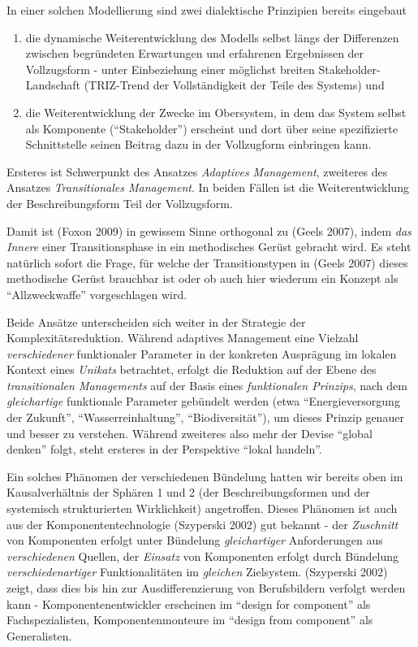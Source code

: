 \documentclass[11pt,a4paper]{article}
\begin{document}
In einer solchen Modellierung sind zwei dialektische Prinzipien bereits
eingebaut

\begin{enumerate}
\item
  die dynamische Weiterentwicklung des Modells selbst längs der
  Differenzen zwischen begründeten Erwartungen und erfahrenen
  Ergebnissen der Vollzugsform - unter Einbeziehung einer möglichst
  breiten Stakeholder-Landschaft (TRIZ-Trend der Vollständigkeit der
  Teile des Systems) und
\item
  die Weiterentwicklung der Zwecke im Obersystem, in dem das System
  selbst als Komponente (``Stakeholder'') erscheint und dort über seine
  spezifizierte Schnittstelle seinen Beitrag dazu in der Vollzugform
  einbringen kann.
\end{enumerate}

Ersteres ist Schwerpunkt des Ansatzes \emph{Adaptives Management},
zweiteres des Ansatzes \emph{Transitionales Management}. In beiden
Fällen ist die Weiterentwicklung der Beschreibungsform Teil der
Vollzugsform.

Damit ist (Foxon 2009) in gewissem Sinne orthogonal zu (Geels 2007),
indem \emph{das Innere} einer Transitionsphase in ein methodisches
Gerüst gebracht wird. Es steht natürlich sofort die Frage, für welche
der Transitionstypen in (Geels 2007) dieses methodische Gerüst brauchbar
ist oder ob auch hier wiederum ein Konzept als ``Allzweckwaffe''
vorgeschlagen wird.

Beide Ansätze unterscheiden sich weiter in der Strategie der
Komplexitätsreduktion. Während adaptives Management eine Vielzahl
\emph{verschiedener} funktionaler Parameter in der konkreten Ausprägung
im lokalen Kontext eines \emph{Unikats} betrachtet, erfolgt die
Reduktion auf der Ebene des \emph{transitionalen Managements} auf der
Basis eines \emph{funktionalen Prinzips}, nach dem \emph{gleichartige}
funktionale Parameter gebündelt werden (etwa ``Energieversorgung der
Zukunft'', ``Wasserreinhaltung'', ``Biodiversität''), um dieses Prinzip
genauer und besser zu verstehen. Während zweiteres also mehr der Devise
``global denken'' folgt, steht ersteres in der Perspektive ``lokal
handeln''.

Ein solches Phänomen der verschiedenen Bündelung hatten wir bereits oben
im Kausalverhältnis der Sphären 1 und 2 (der Beschreibungsformen und der
systemisch strukturierten Wirklichkeit) angetroffen. Dieses Phänomen ist
auch aus der Komponententechnologie (Szyperski 2002) gut bekannt - der
\emph{Zuschnitt} von Komponenten erfolgt unter Bündelung
\emph{gleichartiger} Anforderungen aus \emph{verschiedenen} Quellen, der
\emph{Einsatz} von Komponenten erfolgt durch Bündelung
\emph{verschiedenartiger} Funktionalitäten im \emph{gleichen}
Zielsystem. (Szyperski 2002) zeigt, dass dies bis hin zur
Ausdifferenzierung von Berufsbildern verfolgt werden kann -
Komponentenentwickler erscheinen im ``design for component'' als
Fachspezialisten, Komponentenmonteure im ``design from component'' als
Generalisten.
\end{document}
